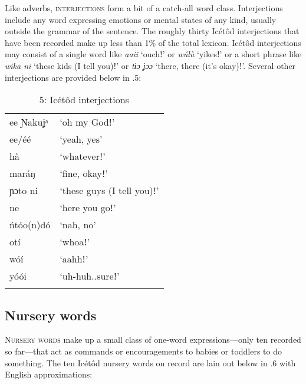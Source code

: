 Like adverbs, \textsc{interjections} form a bit of a catch-all word class. Interjections include any word expressing emotions or mental states of any kind, usually outside the grammar of the sentence. The roughly thirty Icétôd interjections that have been recorded make up less than 1\% of the total lexicon. Icétôd interjections may consist of a single word like \textit{aaii} ‘ouchǃ’ or \textit{wúlù} ‘yikesǃ’ or a short phrase like \textit{wika ni} ‘these kids (I tell you)ǃ’ or \textit{tɨɔ ʝɔɔ} ‘there, there (it’s okay)ǃ’. Several other interjections are provided below in .5:


\begin{table}
\caption{5: Icétôd interjections}
\label{tab:3}


\begin{tabularx}{\textwidth}{XX}
\lsptoprule

ee Ɲakuʝᵃ & ‘oh my Godǃ’\\
ee/éé & ‘yeah, yes’\\
hà & ‘whateverǃ’\\
maráŋ & ‘fine, okayǃ’\\
ɲɔto ni & ‘these guys (I tell you)ǃ’\\
ne & ‘here you goǃ’\\
ńtóo(n)dó & ‘nah, no’\\
otí & ‘whoaǃ’\\
wóí & ‘aahhǃ’\\
yóói & ‘uh-huh..sureǃ’\\
\lspbottomrule
\end{tabularx}
\end{table}



\subsection{Nursery words}


\textsc{Nursery} \textsc{words} make up a small class of one-word expressions—only ten recorded so far—that act as commands or encouragements to babies or toddlers to do something. The ten Icétôd nursery words on record are lain out below in .6 with English approximations:


